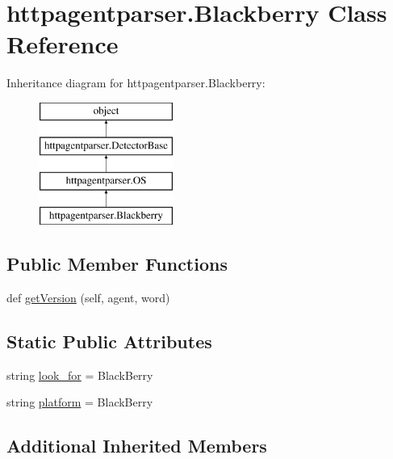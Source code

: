 \hypertarget{classhttpagentparser_1_1_blackberry}{}\section{httpagentparser.\+Blackberry Class Reference}
\label{classhttpagentparser_1_1_blackberry}
Inheritance diagram for httpagentparser.\+Blackberry\+:\begin{figure}[H]
\begin{center}
\leavevmode
\includegraphics[height=4.000000cm]{classhttpagentparser_1_1_blackberry}
\end{center}
\end{figure}
\subsection*{Public Member Functions}
\begin{DoxyCompactItemize}
\item 
def \hyperlink{classhttpagentparser_1_1_blackberry_ae2b90922396fa6882e5eb522af3db497}{get\+Version} (self, agent, word)
\end{DoxyCompactItemize}
\subsection*{Static Public Attributes}
\begin{DoxyCompactItemize}
\item 
string \hyperlink{classhttpagentparser_1_1_blackberry_a693fcf9cd7c2c554afe2da55194bfeb0}{look\+\_\+for} = \textquotesingle{}Black\+Berry\textquotesingle{}
\item 
string \hyperlink{classhttpagentparser_1_1_blackberry_aef6a1b52c5ef41f3b8b5617ac981bca4}{platform} = \textquotesingle{}Black\+Berry\textquotesingle{}
\end{DoxyCompactItemize}
\subsection*{Additional Inherited Members}



